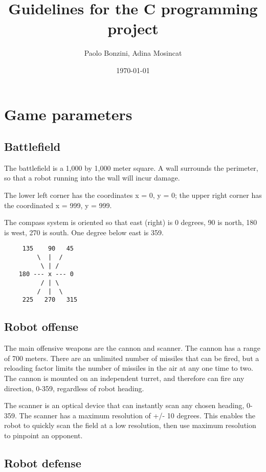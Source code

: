 \documentclass{article}
\title{Guidelines for the C programming project}
\author{Paolo Bonzini, Adina Mosincat}
\date{\today}
\begin{document}
\maketitle

\section{Game parameters}

\subsection{Battlefield}

        The battlefield is a 1,000 by 1,000 meter square.  A wall
        surrounds the perimeter, so that a robot running into the wall
        will incur damage.

        The lower left corner has the coordinates x = 0, y = 0; the upper
        right corner has the coordinated x = 999, y = 999.

        The compass system is oriented so that east (right) is 0
        degrees, 90 is north, 180 is west, 270 is south.  One degree
        below east is 359.


\begin{verbatim}
     135    90   45
         \  |  / 
          \ | /
    180 --- x --- 0
          / | \
         /  |  \ 
     225   270   315
\end{verbatim}


\subsection{Robot offense}

        The main offensive weapons are the cannon and scanner.  The
        cannon has a range of 700 meters.  There are an unlimited number
        of missiles that can be fired, but a reloading factor limits the
        number of missiles in the air at any one time to two.  The cannon
        is mounted on an independent turret, and therefore can fire any
        direction, 0-359, regardless of robot heading.

        The scanner is an optical device that can instantly scan any
        chosen heading, 0-359.  The scanner has a maximum resolution of  
        +/- 10 degrees.  This enables the robot to quickly scan the field
        at a low resolution, then use maximum resolution to pinpoint an
        opponent.


\subsection{Robot defense }
\end{document}

